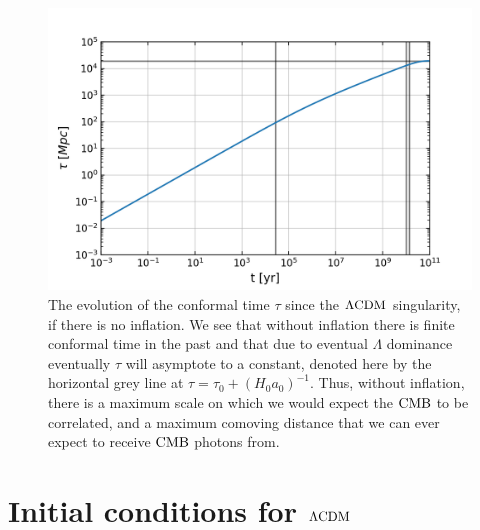 \begin{figure}[!pth]
\centering     %
    \includegraphics[width=.75\columnwidth]{plots/lcdm_tau.png}
\caption{
    The evolution of the conformal time $\tau$ since the $\Lambda\text{CDM}$ singularity,
    if there is no inflation.
    We see that without inflation there is finite conformal time in the past
    and that due to eventual $\Lambda$ dominance
    eventually $\tau$ will asymptote to a constant,
    denoted here by the horizontal grey line at $\tau=\tau_0+(H_0a_0)^{-1}$.
    Thus, without inflation, there is a maximum scale on which we would expect the
    $\text{CMB}$ to be correlated, and a maximum comoving distance that we can ever
    expect to receive $\text{CMB}$ photons from.
}\label{fig:lcdm_tau}
\end{figure}


\section{Initial conditions for $\Lambda\text{CDM}$}
